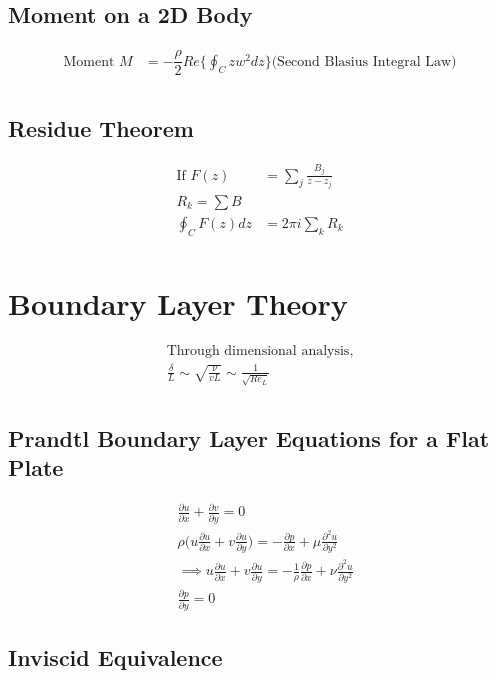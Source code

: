 \documentclass[11pt, letterpaper, notitlepage]{article}
\begin{document}
\subsection{Moment on a 2D Body}
\begin{align*}
\text{Moment } M &= -\dfrac{\rho}{2} Re \Biggl\{ \oint_{C}^{} z w^2 dz \Biggr\} \bigl(\text{Second Blasius Integral Law}\bigr) \\
\end{align*}

\subsection{Residue Theorem}
\begin{align*}
\text{If } F(z) &= \sum_{j}^{} \frac{B_j}{z - z_j} \\
R_k = \sum B \\
\oint_{C}^{} F(z) dz &= 2 \pi i \sum_{k}^{} R_k \\
\end{align*}

\section{Boundary Layer Theory}
\begin{align*}
\text{Through dimensional analysis,} \\
\frac{\delta}{L} \sim \sqrt{\frac{\nu}{v L}} \sim \frac{1}{\sqrt{Re_L}} \\
\end{align*}

\subsection{Prandtl Boundary Layer Equations for a Flat Plate}
\begin{align*}
& \frac{\partial u}{\partial x} + \frac{\partial v}{\partial y} = 0 \\
& \rho \Biggl(u \frac{\partial u}{\partial x} + v \frac{\partial u}{\partial y} \Biggr) = -\frac{\partial p}{\partial x} + \mu \frac{{\partial}^2 u}{\partial y^2} \\
&\implies u \frac{\partial u}{\partial x} + v \frac{\partial u}{\partial y} = -\frac{1}{\rho} \frac{\partial p}{\partial x} + \nu \frac{{\partial}^2 u}{\partial y^2} \\
&\frac{\partial p}{\partial y} = 0
\end{align*}

\subsection{Inviscid Equivalence}
\end{document}
